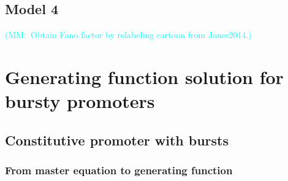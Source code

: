 \documentclass[12pt]{article}%
\newcommand{\mmnote}[1]{\textcolor{cyan}{(MM:~#1)}}
\begin{document}
\subsection{Model 4}
\mmnote{Obtain Fano factor by relabeling cartoon from Jones2014.}

\section{Generating function solution for bursty promoters}

\subsection{Constitutive promoter with bursts}

\subsubsection{From master equation to generating function}
\end{document}
